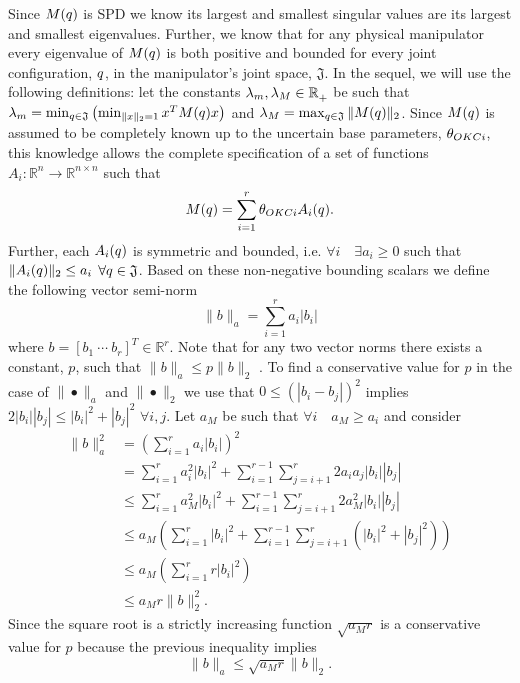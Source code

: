 Since $M(q)$ is \ac{SPD} we know its largest and
smallest singular values are its largest and smallest
eigenvalues. Further, we know that for any physical manipulator every
eigenvalue of $M(q)$ is both positive and bounded for every joint
configuration, $q$, in the manipulator's joint space, $\mathfrak{J}$.
%
In the sequel, we will use the following definitions: 
let the
constants $\lambda_m,\lambda_M\in\mathbb{R}^{}_+$ be such that
$\lambda_m=\min_{q\in\mathfrak{J}} \left(\min_{\|x\|_2=1}x^T M(q) x
\right)$ and $\lambda_M=\max_{q\in\mathfrak{J}}\|M(q)\|_2$.  Since
$M(q)$ is assumed to be completely known up to the uncertain base
parameters, $\theta_{OKCi}$, this knowledge allows the complete
specification of a set of functions
$A_i:\mathbb{R}^n\to\mathbb{R}^{n\times n}$ such that
%
\begin{equation}
M(q)=\sum_{i=1}^r \theta_{OKCi} A_i(q).
\end{equation} 
%
Further, each $A_i(q)$ is symmetric and bounded,
i.e. $\forall i\quad\exists a_i\geq 0$ such that $\|A_i(q)\|_2\leq a_i$
$\forall q\in \mathfrak{J}$. Based on these non-negative bounding
scalars we define the following vector semi-norm
%
\begin{equation}
\|b\|_a=\sum_{i=1}^r a_i |b_i|
\end{equation}
%
where $b=[b_1~\cdots ~ b_r]^T\in \mathbb{R}^r$.  Note that for
any two vector norms there exists a constant, $p$, such that
$\|b\|_a\leq p \|b\|_2$ \cite{horn&johnson}. To find a conservative value
for $p$ in the case of $\|\bullet\|_a$ and $\|\bullet\|_2$ we use that
$0\leq(|b_i-b_j|)^2$ implies $2|b_i||b_j|\leq |b_i|^2 + |b_j|^2$
$\forall i,j$.  Let $a_M$ be such that $\forall i\quad a_M\geq a_i$ and
consider
%
\begin{align}
  \|b\|_a^2
  &=\left(\sum_{i=1}^r a_i |b_i|\right)^2                \nonumber \\
  &=\sum_{i=1}^r a_i^2 |b_i|^2 +
   \sum_{i=1}^{r-1}\sum_{j=i+1}^{r}2a_ia_j|b_i||b_j|        \nonumber \\
  &\leq \sum_{i=1}^r a_M^2 |b_i|^2 +
   \sum_{i=1}^{r-1}\sum_{j=i+1}^{r}2a_M^2|b_i||b_j|         \nonumber \\
  &\leq a_M\left(\sum_{i=1}^r |b_i|^2 +\sum_{i=1}^{r-1} 
   \sum_{j=i+1}^{r}\left(|b_i|^2 + |b_j|^2\right)\right)  \nonumber \\ 
  &\leq a_M\left(\sum_{i=1}^r r |b_i|^2\right)           \nonumber \\ 
  &\leq a_Mr\|b\|_2^2.
\end{align}   
%
Since the square root is a strictly increasing function
$\sqrt{a_M r}$ is a conservative value for $p$ because the previous
inequality implies
%
\begin{equation}
\|b\|_a\leq \sqrt{a_M r} \|b\|_2.
\end{equation}

